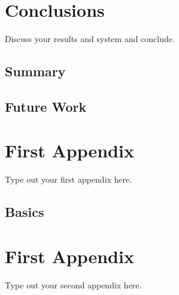\documentclass[a4paper,oneside,12pt]{report}
\begin{document}
\chapter{Conclusions}
\label{ch:conc}

Discuss your results and system and conclude.

\section{Summary}

\section{Future Work}

\appendix
\chapter{First Appendix}
Type out your first appendix here.
\section{Basics}

\chapter{First Appendix}
Type out your second appendix here.

% 
% 



\end{document}
